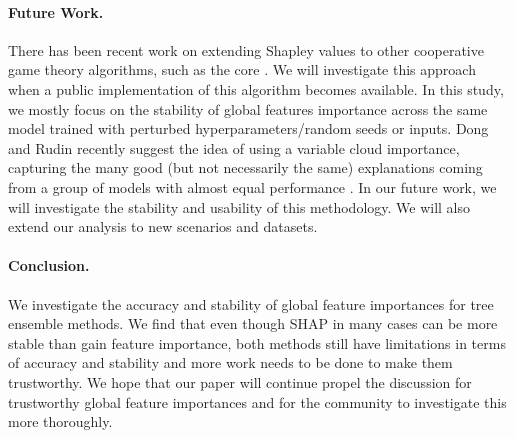 \paragraph{Future Work.} There has been recent work on extending Shapley values to other cooperative game theory algorithms, such as the core \cite{yan2020if}. We will investigate this approach when a public implementation of this algorithm becomes available. In this study, we mostly focus on the stability of global features importance across the same model trained with perturbed hyperparameters/random seeds or inputs. Dong and Rudin recently suggest the idea of using a variable cloud importance, capturing the many good (but not necessarily the same) explanations coming from a group of models with almost equal performance \cite{dong2019variable}. In our future work, we will investigate the stability and usability of this methodology. We will also extend our analysis to new scenarios and datasets.  %


\paragraph{Conclusion.} We investigate the accuracy and stability of global feature importances for tree ensemble methods. We find that even though SHAP in many cases can be more stable than gain feature importance, both methods still have limitations in terms of accuracy and stability and more work needs to be done to make them trustworthy. We hope that our paper will continue propel the discussion for trustworthy global feature importances and for the community to investigate this more thoroughly.